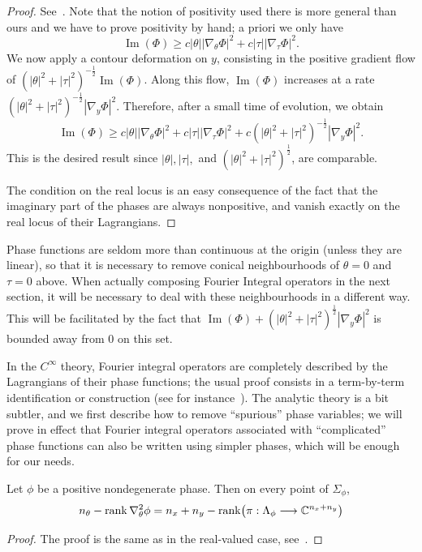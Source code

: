 \documentclass[AHL,Unicode,longabstracts,published]{cedram}
\DeclareMathOperator{\im}{Im}
\DeclareMathOperator{\rank}{rank}
\newcommand\1{\mathds{1}}
\newcommand{\C}{\mathbb{C}}
\renewcommand*{\to}{\mathchoice{\longrightarrow}{\rightarrow}{\rightarrow}{\rightarrow}}
\let\originalleft\left
\let\originalright\right
\renewcommand{\left}{\mathopen{}\mathclose\bgroup\originalleft}
\renewcommand{\right}{\aftergroup\egroup\originalright}
\begin{document}
\begin{proof}
See~\cite[Proposition~25.5.4]{hormander_analysis_1985}. Note that the notion of positivity used there is more general than ours and we have to prove positivity by hand; a priori we only have
\[
\im(\Phi)\geq c|\theta||\nabla_{\theta}\Phi|^2+c|\tau||\nabla_{\tau}\Phi|^2.
\]
We now apply a contour deformation on $y$, consisting in the positive gradient flow of $(|\theta|^2+|\tau|^2)^{-\frac{1}{2}}\im(\Phi)$. Along this flow, $\im(\Phi)$ increases at a rate $(|\theta|^2+|\tau|^2)^{-\frac{1}{2}}|\nabla_y\Phi|^2$. Therefore, after a small time of evolution, we obtain
\[
\im(\Phi)\geq c|\theta||\nabla_{\theta}\Phi|^2+c|\tau||\nabla_{\tau}\Phi|^2+c(|\theta|^2+|\tau|^2)^{-\frac{1}{2}}|\nabla_y\Phi|^2.
\]
This is the desired result since $|\theta|, |\tau|,$ and $(|\theta|^2+|\tau|^2)^{\frac 12}$, are comparable.

The condition on the real locus is an easy consequence of the fact that the imaginary part of the phases are always nonpositive, and vanish exactly on the real locus of their Lagrangians.
\end{proof}

Phase functions are seldom more than continuous at the origin (unless they are linear), so that it is necessary to remove conical neighbourhoods of $\theta=0$ and $\tau=0$ above. When actually composing Fourier {Integral} operators in the next section, it will be necessary to deal with these neighbourhoods in a different way. This will be facilitated by the fact that $\im(\Phi)+(|\theta|^2+|\tau|^2)^{\frac 12}|\nabla_y\Phi|^2$ is bounded away from $0$ on this set.



In the $C^{\infty}$ theory, Fourier {integral operators} are completely described by the Lagrangians of their phase functions; the usual proof consists in a term-by-term identification or construction (see for instance~\cite[Proposition~25.1.5]{hormander_analysis_1985}). The analytic theory is a bit subtler, and we first describe how to remove ``spurious'' phase variables; we will prove in effect that Fourier {integral operators} associated with ``complicated'' phase functions can also be written using simpler phases, which will be enough for our needs.

\begin{prop}\label{prop:excess}
Let $\phi$ be a positive
nondegenerate phase. Then on every point of $\Sigma_{\phi}$,
\[
n_{\theta}-\rank\nabla^2_{\theta}\phi=n_x+n_y-\rank\left(\pi:\Lambda_{\phi}\to\C^{n_x+n_y}\right)
\]
\end{prop}
\begin{proof}
The proof is the same as in the real-valued case, see~\cite[Proposition~18.4.1]{treves_analytic_2022}.
\end{proof}
\end{document}

